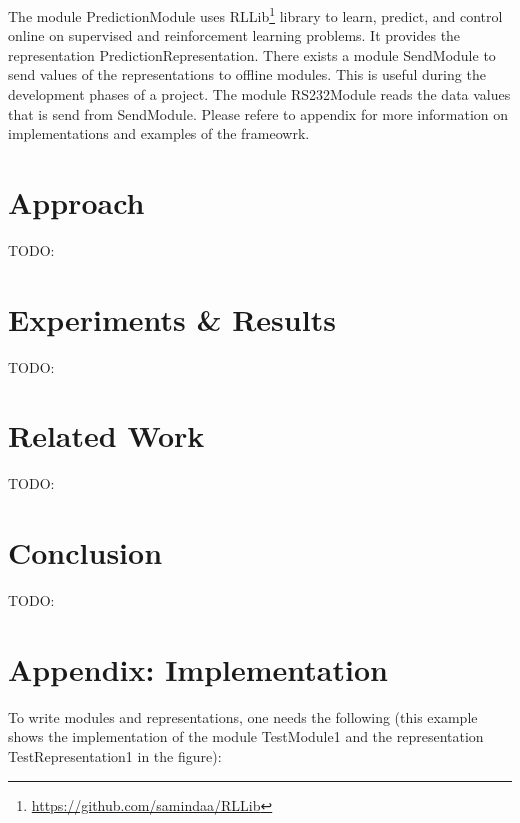 \documentclass{llncs}
\begin{document}
\begin{sloppy}
The module {\sf PredictionModule} uses {\sf
RLLib}\footnote{\url{https://github.com/samindaa/RLLib}} library to learn, predict, and control
online on supervised and reinforcement learning problems. It provides
the representation {\sf PredictionRepresentation}. There exists a module {\sf SendModule} to send
values of the representations to offline modules. This is useful during the development phases of
a project. The module {\sf RS232Module} reads the data values that is send from {\sf SendModule}.
Please refere  to appendix for more information on implementations and
examples of the frameowrk.

\section{Approach}
TODO:

\section{Experiments \& Results}
TODO:

\section{Related Work}
TODO:

\section{Conclusion}
TODO:




\section*{Appendix: Implementation}
\label{appendix:Implementation}
To write modules and representations, one needs the following (this example shows the implementation
of the module TestModule1 and the representation TestRepresentation1 in the figure):

\end{sloppy}
\end{document}
